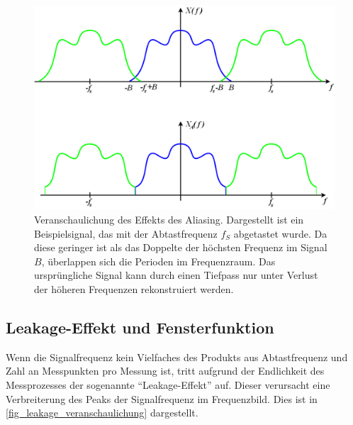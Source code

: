 \documentclass[
a4paper,
12pt,
pagesize,
ngerman
]{scrartcl}
\begin{document}
	\begin{figure}[H]  
		\includegraphics[width=1\textwidth]{EIRE2018Dateien/sonstige_Dateien/AliasedSpectrum}
		\centering
		\caption{
			Veranschaulichung des Effekts des Aliasing. Dargestellt ist ein Beispielsignal, das mit der Abtastfrequenz $f_S$ abgetastet wurde.
			Da diese geringer ist als das Doppelte der höchsten Frequenz im Signal $B$, überlappen sich die Perioden im Frequenzraum.
			Das ursprüngliche Signal kann durch einen Tiefpass nur unter Verlust der höheren Frequenzen rekonstruiert werden. \cite{Aliasing}
		}
		\label{fig_Aliasing_veranschaulichung}
		\centering
	\end{figure}
	
	
	\subsection{Leakage-Effekt und Fensterfunktion}
	\label{leakage}
	Wenn die Signalfrequenz kein Vielfaches des Produkts aus Abtastfrequenz und Zahl an Messpunkten pro Messung ist, tritt aufgrund der Endlichkeit des Messprozesses der sogenannte \enquote{Leakage-Effekt} auf.
	Dieser verursacht eine Verbreiterung des Peaks der Signalfrequenz im Frequenzbild.
	Dies ist in \cref{fig_leakage_veranschaulichung} dargestellt.
	
\end{document}
